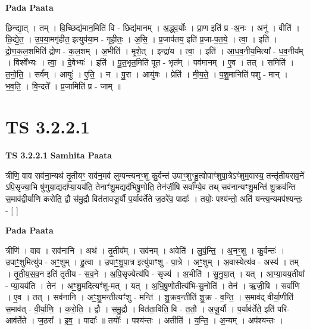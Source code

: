 \documentclass[17pt]{extarticle}
\begin{document}
\textbf{Pada Paata} \newline

छि॒न्द्या॒त् । तम् । वि॒च्छिद्य॑मान॒मिति॑ वि - छिद्य॑मानम् । अ॒द्ध्व॒र्योः । प्रा॒ण इति॑ प्र -अ॒नः । अनु॑ । वीति॑ । छि॒द्ये॒त॒ । उ॒प॒या॒मगृ॑हीत॒ इत्युप॑या॒म - गृ॒ही॒तः॒ । अ॒सि॒ । प्र॒जाप॑तय॒ इति॑ प्र॒जा-प॒त॒ये॒ । त्वा॒ । इति॑ । द्रो॒ण॒क॒ल॒शमिति॑ द्रोण - क॒ल॒शम् । अ॒भीति॑ । मृ॒शे॒त् । इन्द्रा॑य । त्वा॒ । इति॑ । आ॒ध॒व॒नीय॒मित्या᳚ - ध॒व॒नीय᳚म् । विश्वे᳚भ्यः । त्वा॒ । दे॒वेभ्यः॑ । इति॑ । पू॒त॒भृत॒मिति॑ पूत - भृत᳚म् । पव॑मानम् । ए॒व । तत् । समिति॑ । त॒नो॒ति॒ । सर्व᳚म् । आयुः॑ । ए॒ति॒ । न । पु॒रा । आयु॑षः । प्रेति॑ । मी॒य॒ते॒ । प॒शु॒मानिति॑ पशु - मान् । भ॒व॒ति॒ । वि॒न्दते᳚ । प्र॒जामिति॑ प्र - जाम् ॥  \newline




\section*{ TS 3.2.2.1 }

\textbf{TS 3.2.2.1 } \newline
\textbf{Samhita Paata} \newline

त्रीणि॒ वाव सव॑ना॒न्यथ॑ तृ॒तीयꣳ॒॒ सव॑न॒मव॑ लुम्पन्त्यनꣳ॒॒शु कु॒र्वन्त॑ उपाꣳ॒॒शुꣳहु॒त्वोपाꣳ॑शुपा॒त्रेऽꣳ॑शुम॒वास्य॒ तन्तृ॑तीयसव॒ने॑ ऽपि॒सृज्या॒भि षु॑णुया॒द्यदा᳚प्या॒यय॑ति॒ तेनाꣳ॑शु॒मद्यद॑भिषु॒णोति॒ तेन॑र्जी॒षि सर्वा᳚ण्ये॒व तथ् सव॑नान्यꣳशु॒मन्ति॑ शु॒क्रव॑न्ति स॒माव॑द्वीर्याणि करोति॒ द्वौ स॑मु॒द्रौ वित॑तावजू॒र्यौ प॒र्याव॑र्तेते ज॒ठरे॑व॒ पादाः᳚ । तयोः॒ पश्य॑न्तो॒ अति॑ यन्त्य॒न्यमप॑श्यन्तः॒ - [  ] \newline

\textbf{Pada Paata} \newline

त्रीणि॑ । वाव । सव॑नानि । अथ॑ । तृ॒तीय᳚म् । सव॑नम् । अवेति॑ । लु॒पं॒न्ति॒ । अ॒नꣳ॒॒शु । कु॒र्वन्तः॑ । उ॒पाꣳ॒॒शुमित्यु॑प - अꣳ॒॒शुम् । हु॒त्वा । उ॒पाꣳ॒॒शु॒पा॒त्र इत्यु॑पाꣳशु - पा॒त्रे । अꣳ॒॒शुम् । अ॒वास्येत्य॑व - अस्य॑ । तम् । तृ॒ती॒य॒स॒व॒न इति॑ तृतीय - स॒व॒ने । अ॒पि॒सृज्येत्य॑पि - सृज्य॑ । अ॒भीति॑ । सु॒नु॒या॒त् । यत् । आ॒प्या॒यय॒तीया᳚ - प्या॒यय॑ति । तेन॑ । अꣳ॒॒शु॒मदित्यꣳ॑शु-मत् । यत् । अ॒भि॒षु॒णोतीत्य॑भि-सु॒नोति॑ । तेन॑ । ऋ॒जी॒षि । सर्वा॑णि । ए॒व । तत् । सव॑नानि । अꣳ॒॒शु॒मन्तीत्यꣳ॑शु - मन्ति॑ । शु॒क्रव॒न्तीति॑ शु॒क्र - व॒न्ति॒ । स॒माव॑द् वीर्या॒णीति॑ स॒माव॑त् - वी॒र्या॒णि॒ । क॒रो॒ति॒ । द्वौ । स॒मु॒द्रौ । वित॑ता॒विति॒ वि - त॒तौ॒ । अ॒जू॒र्यौ । प॒र्याव॑र्तेते॒ इति॑ परि-आव॑र्तेते । ज॒ठरा᳚ । इ॒व॒ । पादाः᳚ ॥ तयोः᳚ । पश्य॑न्तः । अतीति॑ । य॒न्ति॒ । अ॒न्यम् । अप॑श्यन्तः ।  \newline
\end{document}
